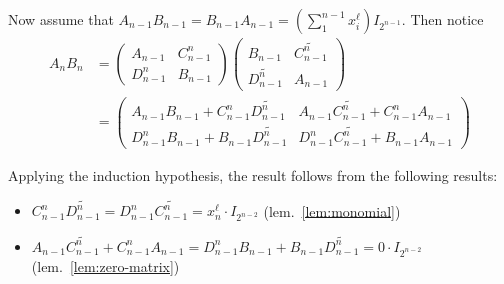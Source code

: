 \documentclass [11pt, proquest] {uwthesis}[2020/02/24]
\begin{document}
\begin{prf}
        Now assume that $A_{n-1}B_{n-1}=B_{n-1}A_{n-1}=(\sum_1^{n-1}x_i^\ell)I_{2^{n-1}}.$ Then notice
        \begin{align*}
            A_nB_n&=\begin{pmatrix}A_{n-1} & C_{n-1}^n\\D_{n-1}^n& B_{n-1}\end{pmatrix}\begin{pmatrix}B_{n-1}&\widetilde{C_{n-1}^n}\\ \widetilde{D_{n-1}^n} & A_{n-1}\end{pmatrix}\\
            &=\begin{pmatrix}A_{n-1}B_{n-1}+C_{n-1}^n\widetilde{D_{n-1}^n} & A_{n-1}\widetilde{C_{n-1}^n}+C_{n-1}^nA_{n-1}\\
        D_{n-1}^nB_{n-1}+B_{n-1}\widetilde{D_{n-1}^n} & D_{n-1}^n\widetilde{C_{n-1}^n}+B_{n-1}A_{n-1}\end{pmatrix}
        \end{align*}
        
        Applying the induction hypothesis, the result follows from the following results:
        \begin{itemize}
            \item $C_{n-1}^n\widetilde{D_{n-1}^n}=D_{n-1}^n\widetilde{C_{n-1}^n}=x_n^\ell \cdot I_{2^{n-2}}$ (lem.~\ref{lem:monomial})
            \item $A_{n-1}\widetilde{C_{n-1}^n}+C_{n-1}^nA_{n-1} = D_{n-1}^nB_{n-1}+B_{n-1}\widetilde{D_{n-1}^n}=0\cdot I_{2^{n-2}}$ (lem.~\ref{lem:zero-matrix})
        \end{itemize}
    \end{prf}
        
\end{document}
